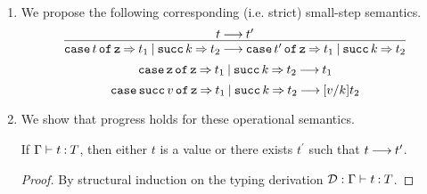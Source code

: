\documentclass[11pt,letterpaper]{article}
\renewcommand{\succ}{\operatorname{\mathtt{succ}}}
\newcommand{\nat}{\mathtt{nat}}
\newcommand{\case}[1]{\operatorname{\mathtt{case}}#1\operatorname{\mathtt{of}}}
\begin{document}
\begin{enumerate}
\begin{proof}
\begin{description}
          By the induction hypothesis on $\mathcal{D}_0$ and $\mathcal{E}_0$,
          we deduce
          $\mathcal{E}_0^\prime : \Gamma \proves \succ v^\prime \hastype \nat$.

          By inverting the typing rule for $\succ$ in $\mathcal{E}_0^\prime$,
          we deduce
          $\mathcal{E}_0^{\prime\prime} :
          \Gamma \proves v^\prime \hastype \nat$.

          By the substitution lemma on $\mathcal{E}_0^{\prime\prime}$ and
          $\mathcal{E}_2$,
          we deduce
          $\mathcal{E}_2^\prime :
          \Gamma \proves [v^\prime/k]t_2 \hastype T$.

          By the induction hypothesis on
          $\mathcal{D}_1$ and $\mathcal{E}_2^\prime$,
          we deduce $\Gamma \proves v \hastype T$, as required.
      \end{description}
    \end{proof}

  \item
    We propose the following corresponding (i.e. strict) small-step semantics.
    \begin{equation*}
      \infer{%
        \case{t} \mathtt{z} \goesto t_1 \orcase \succ k \goesto t_2
        \evalto
        \case{t^\prime} \mathtt{z} \goesto t_1 \orcase \succ k \goesto t_2
      }{t \evalto t^\prime} \\
    \end{equation*}
    \begin{equation*}
      \case{\mathtt{z}} \mathtt{z} \goesto t_1 \orcase \succ k \goesto t_2
      \evalto
      t_1
    \end{equation*}
    \begin{equation*}
      \case{\succ v} \mathtt{z} \goesto t_1 \orcase \succ k \goesto t_2
      \evalto
      [v/k]t_2
    \end{equation*}

  \item
    We show that progress holds for these operational semantics.
    \begin{prop}
      If $\Gamma \vdash t \mathbin{:} T$, then
      either $t$ is a value or there exists $t^\prime$ such that $t \mathbin{\longrightarrow}
      t^\prime$.
    \end{prop}
    \begin{proof}
      By structural induction on the typing derivation
      $\mathcal{D} : \Gamma \vdash t \mathbin{:} T$.


\end{proof}
\end{enumerate}
\end{document}

